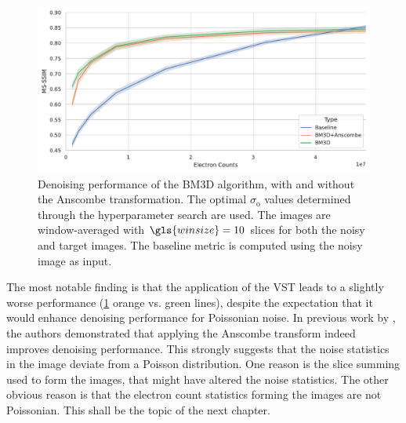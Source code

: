 \begin{figure}
    \centering
    \includegraphics[width=1\linewidth]{images/bm3d_msssim.pdf}
    \caption{Denoising performance of the \gls{BM3D} algorithm, with and without the Anscombe transformation. The optimal $\sigma_{\text{o}}$ values determined through the hyperparameter search are used. The images are window-averaged with $\gls{winsize}=10$ slices for both the noisy and target images. The baseline metric is computed using the noisy image as input.}
    \label{fig:bm3d-msssim}
\end{figure}


The most notable finding is that the application of the \gls{VST} leads to a slightly worse performance (\cref{fig:bm3d-msssim} orange vs. green lines), despite the expectation that it would enhance denoising performance for Poissonian noise. In previous work by \citeauthor{makitaloOptimalInversionAnscombe2011}, the authors demonstrated that applying the Anscombe transform indeed improves denoising performance. This strongly suggests that the noise statistics in the image deviate from a Poisson distribution. One reason is the slice summing used to form the images, that might have altered the noise statistics. The other obvious reason is that the electron count statistics forming the images are not Poissonian. This shall be the topic of the next chapter. 
